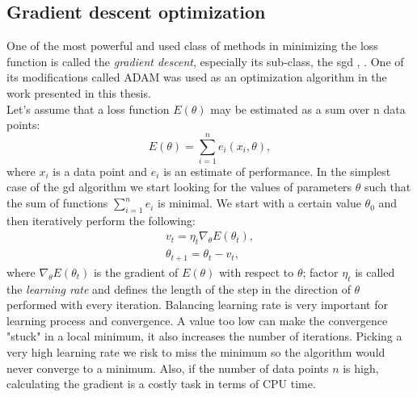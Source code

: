 \subsection{Gradient descent optimization}
One of the most powerful and used class of methods in minimizing the loss function is called the \textit{gradient descent}, \cite{gradient} especially its sub-class, the \gls{sgd} \cite{sgd1}, \cite{sgd2}. One of its modifications called ADAM \cite{kingma2014method} was used as an optimization algorithm in the work presented in this thesis. \\
Let's assume that a loss function $E(\theta)$ may be estimated as a sum over n data points:
\begin{equation}
E(\theta) = \sum^n_{i=1} e_i(x_i,\theta),
\end{equation}
where $x_i$ is a data point and $e_i$ is an estimate of performance. In the simplest case of the \gls{gd} algorithm we start looking for the values of parameters $\theta$ such that the sum of functions $\sum^n_{i=1}e_i$ is minimal. We start with a certain value $\theta_0$ and then iteratively perform the following:
\begin{equation}
\begin{array}{lcl} 
v_t=\eta_t\nabla_{\theta}E(\theta_t),\\
\theta_{t+1}=\theta_t-v_t,
\end{array} 
\end{equation}
where $\nabla_{\theta}E(\theta_t)$ is the gradient of $E(\theta)$ with respect to $\theta$; factor $\eta_t$ is called the \textit{learning rate} and defines the length of the step in the direction of $\theta$ performed with every iteration. Balancing learning rate is very important for learning process and convergence. A value too low can make the convergence "stuck" in a local minimum, it also increases the number of iterations. Picking a very high learning rate we risk to miss the minimum so the algorithm would never converge to a minimum. Also, if the number of data points $n$ is high, calculating the gradient is a costly task in terms of CPU time. 

